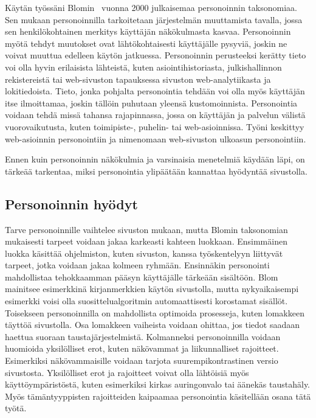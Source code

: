 \documentclass[finnish, 12pt, a4paper, elec, utf8, a-1b, online]{aaltothesis}
\begin{document}
Käytän työssäni Blomin~\cite{10.1145/633292.633483} vuonna 2000 julkaisemaa
personoinnin taksonomiaa. Sen mukaan personoinnilla tarkoitetaan järjestelmän
muuttamista tavalla, jossa sen henkilökohtainen merkitys käyttäjän näkökulmasta
kasvaa. Personoinnin myötä tehdyt muutokset ovat lähtökohtaisesti käyttäjälle
pysyviä, joskin ne voivat muuttua edelleen käytön jatkuessa. Personoinnin
perusteeksi kerätty tieto voi olla hyvin erilaisista lähteistä, kuten
asiointihistoriasta, julkishallinnon rekistereistä tai web-sivuston tapauksessa
sivuston web-analytiikasta ja lokitiedoista. Tieto, jonka pohjalta personointia
tehdään voi olla myös käyttäjän itse ilmoittamaa, joskin tällöin puhutaan
yleensä kustomoinnista. Personointia voidaan tehdä missä tahansa rajapinnassa,
jossa on käyttäjän ja palvelun välistä vuorovaikutusta, kuten toimipiste-,
puhelin- tai web-asioinnissa. Työni keskittyy web-asioinnin personointiin ja
nimenomaan web-sivuston ulkoasun personointiin.

Ennen kuin personoinnin näkökulmia ja varsinaisia menetelmiä käydään läpi, on
tärkeää tarkentaa, miksi personointia ylipäätään kannattaa hyödyntää
sivustolla.

\subsection{Personoinnin hyödyt}\label{personalization-pros}

Tarve personoinnille vaihtelee sivuston mukaan, mutta Blomin taksonomian
mukaisesti tarpeet voidaan jakaa karkeasti kahteen luokkaan. Ensimmäinen luokka
käsittää ohjelmiston, kuten sivuston, kanssa työskentelyyn liittyvät tarpeet,
jotka voidaan jakaa kolmeen ryhmään. Ensinnäkin personointi mahdollistaa
tehokkaamman pääsyn käyttäjälle tärkeään sisältöön. Blom mainitsee esimerkkinä
kirjanmerkkien käytön sivustolla, mutta nykyaikaisempi esimerkki voisi olla
suosittelualgoritmin automaattisesti korostamat sisällöt. Toisekseen
personoinnilla on mahdollista optimoida prosesseja, kuten lomakkeen täyttöä
sivustolla. Osa lomakkeen vaiheista voidaan ohittaa, jos tiedot saadaan haettua
suoraan taustajärjestelmistä. Kolmanneksi personoinnilla voidaan huomioida
yksilölliset erot, kuten näkövammat ja liikunnalliset rajoitteet. Esimerkiksi
näkövammaisille voidaan tarjota suurempikontrastinen versio sivustosta.
Yksilölliset erot ja rajoitteet voivat olla lähtöisiä myös käyttöympäristöstä,
kuten esimerkiksi kirkas auringonvalo tai äänekäs taustahäly. Myös
tämäntyyppisten rajoitteiden kaipaamaa personointia käsitellään osana tätä
työtä.
\end{document}
